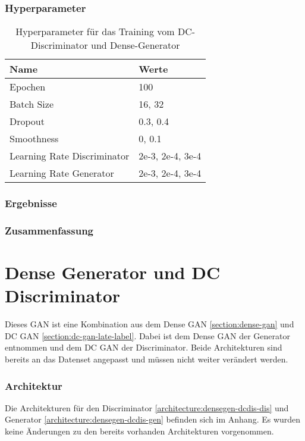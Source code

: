 \subsubsection{Hyperparameter}
\begin{table}[H]
	\centering
	\begin{tabular}{l l}
		Name                        & Werte            \\ \hline
		Epochen                     & 100              \\
		Batch Size                  & 16, 32           \\
		Dropout                     & 0.3, 0.4         \\
		Smoothness                  & 0, 0.1           \\
		Learning Rate Discriminator & 2e-3, 2e-4, 3e-4 \\
		Learning Rate Generator     & 2e-3, 2e-4, 3e-4
	\end{tabular}
	\caption{Hyperparameter für das Training vom DC-Discriminator und Dense-Generator}
\end{table}
\subsubsection{Ergebnisse}
\subsubsection{Zusammenfassung}

\section{Dense Generator und DC Discriminator}
Dieses GAN ist eine Kombination aus dem Dense GAN \cref{section:dense-gan} und DC GAN \cref{section:dc-gan-late-label}.
Dabei ist dem Dense GAN der Generator entnommen und dem DC GAN der Discriminator.
Beide Architekturen sind bereits an das Datenset angepasst und müssen nicht weiter verändert werden.

\subsubsection{Architektur}
Die Architekturen für den Discriminator \cref{architecture:densegen-dcdis-dis} und Generator \cref{architecture:densegen-dcdis-gen} befinden sich im Anhang.
Es wurden keine Änderungen zu den bereits vorhanden Architekturen vorgenommen.

